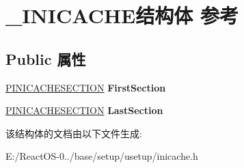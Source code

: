 \hypertarget{struct___i_n_i_c_a_c_h_e}{}\section{\+\_\+\+I\+N\+I\+C\+A\+C\+H\+E结构体 参考}
\label{struct___i_n_i_c_a_c_h_e}
\subsection*{Public 属性}
\begin{DoxyCompactItemize}
\item 
\mbox{\label{struct___i_n_i_c_a_c_h_e_a8d48930ecacc5abb61a9b2251f44f116}} 
\hyperlink{struct___i_n_i_c_a_c_h_e_s_e_c_t_i_o_n}{P\+I\+N\+I\+C\+A\+C\+H\+E\+S\+E\+C\+T\+I\+ON} {\bfseries First\+Section}
\item 
\mbox{\label{struct___i_n_i_c_a_c_h_e_a2d12a725a847175d77f39fcdb40b53e4}} 
\hyperlink{struct___i_n_i_c_a_c_h_e_s_e_c_t_i_o_n}{P\+I\+N\+I\+C\+A\+C\+H\+E\+S\+E\+C\+T\+I\+ON} {\bfseries Last\+Section}
\end{DoxyCompactItemize}


该结构体的文档由以下文件生成\+:\begin{DoxyCompactItemize}
\item 
E\+:/\+React\+O\+S-\/0../base/setup/usetup/inicache.\+h\end{DoxyCompactItemize}
